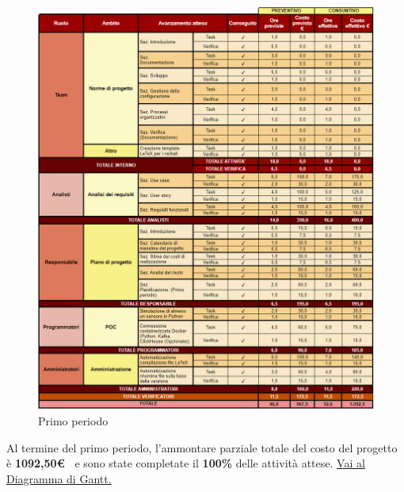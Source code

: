 \begin{figure}[H]
    \centering
    \includegraphics[height=1.0\textwidth]{../Images/periodo1.PNG}
    \caption{Primo periodo}
    \label{fig:1periodo}
\end{figure}

Al termine del primo periodo, l'ammontare parziale totale del costo del progetto è \textbf{ 1092,50\euro\ } e sono state completate il \textbf{100\%} delle attività attese.
\href{https://github.com/orgs/ByteOps-swe/projects/3/views/1?sortedBy%5Bdirection%5D=asc&sortedBy%5BcolumnId%5D=64182560}{Vai al Diagramma di Gantt.}

